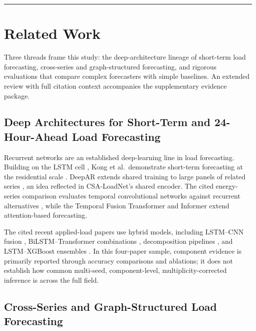 \documentclass[electronics,article,submit,moreauthors]{Definitions/mdpi}
\begin{document}
\begin{center}\rule{0.5\linewidth}{0.5pt}\end{center}

\section{Related Work}\label{related-work}

Three threads frame this study: the deep-architecture lineage of short-term load forecasting, cross-series and graph-structured forecasting, and rigorous evaluations that compare complex forecasters with simple baselines. An extended review with full citation context accompanies the supplementary evidence package.

\subsection{Deep Architectures for Short-Term and 24-Hour-Ahead Load Forecasting}\label{deep-architectures-for-short-term-and-24-hour-ahead-load-forecasting}

Recurrent networks are an established deep-learning line in load forecasting. Building on the LSTM cell \cite{ref9}, Kong et al.~demonstrate short-term forecasting at the residential scale \cite{ref10}. DeepAR extends shared training to large panels of related series \cite{ref11}, an idea reflected in CSA-LoadNet's shared encoder. The cited energy-series comparison evaluates temporal convolutional networks against recurrent alternatives \cite{ref12}, while the Temporal Fusion Transformer \cite{ref13} and Informer \cite{ref14} extend attention-based forecasting.

The cited recent applied-load papers use hybrid models, including LSTM--CNN fusion \cite{ref15}, BiLSTM--Transformer combinations \cite{ref16}, decomposition pipelines \cite{ref17}, and LSTM--XGBoost ensembles \cite{ref18}. In this four-paper sample, component evidence is primarily reported through accuracy comparisons and ablations; it does not establish how common multi-seed, component-level, multiplicity-corrected inference is across the full field.

\subsection{Cross-Series and Graph-Structured Load Forecasting}\label{cross-series-and-graph-structured-load-forecasting}
\end{document}
